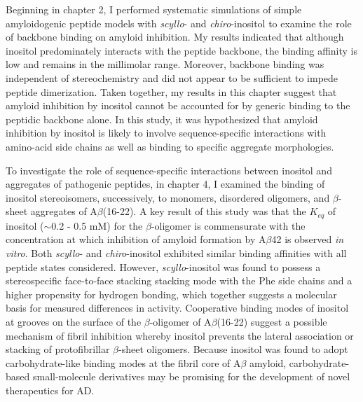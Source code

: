 
Beginning in chapter 2, I performed systematic simulations of simple amyloidogenic peptide models with \textit{scyllo}- and \textit{chiro}-inositol to examine the role of backbone binding on amyloid inhibition. My results indicated that although inositol predominately interacts with the peptide backbone, the binding affinity is low and remains in the millimolar range. Moreover, backbone binding was independent of stereochemistry and did not appear to be sufficient to impede peptide dimerization. Taken together, my results in this chapter suggest that amyloid inhibition by inositol cannot be accounted for by generic binding to the peptidic backbone alone. In this study, it was hypothesized that amyloid inhibition by inositol is likely to involve sequence-specific interactions with amino-acid side chains as well as binding to specific aggregate morphologies.

To investigate the role of sequence-specific interactions between inositol and aggregates of pathogenic peptides, in chapter 4, I examined the binding of inositol stereoisomers, successively, to monomers, disordered oligomers, and $\beta$-sheet aggregates of A$\beta$(16-22). A key result of this study was that the $K_{eq}$ of inositol ($\sim$0.2 - 0.5 mM) for the $\beta$-oligomer is commensurate with the concentration at which inhibition of amyloid formation by A$\beta$42 is observed \emph{in vitro}. Both \emph{scyllo}- and \emph{chiro}-inositol exhibited similar binding affinities with all peptide states considered. However,  \textit{scyllo}-inositol was found to possess a stereospecific face-to-face stacking stacking mode with the Phe side chains and a higher propensity for hydrogen bonding, which together suggests a molecular basis for measured differences in activity.  Cooperative binding modes of inositol at grooves on the surface of the $\beta$-oligomer of A$\beta$(16-22) suggest a possible mechanism of fibril inhibition whereby inositol prevents the lateral association or stacking of protofibrillar $\beta$-sheet oligomers. Because inositol was found to adopt carbohydrate-like binding modes at the fibril core of A$\beta$ amyloid, carbohydrate-based small-molecule derivatives may be promising for the development of novel therapeutics for AD.

